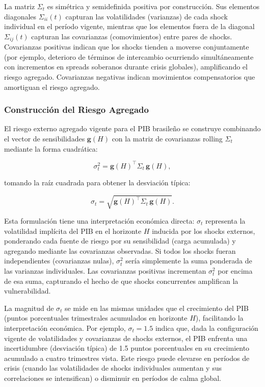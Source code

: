 \documentclass[3p,11pt,draft,natbib=false]{elsarticle}
\newcommand{\vect}[1]{\boldsymbol{#1}}
\begin{document}
La matriz $\Sigma_t$ es simétrica y semidefinida positiva por construcción. Sus elementos diagonales $\Sigma_{ii}(t)$ capturan las volatilidades (varianzas) de cada shock individual en el período vigente, mientras que los elementos fuera de la diagonal $\Sigma_{ij}(t)$ capturan las covarianzas (comovimientos) entre pares de shocks. Covarianzas positivas indican que los shocks tienden a moverse conjuntamente (por ejemplo, deterioro de términos de intercambio ocurriendo simultáneamente con incrementos en spreads soberanos durante crisis globales), amplificando el riesgo agregado. Covarianzas negativas indican movimientos compensatorios que amortiguan el riesgo agregado.

\subsubsection{Construcción del Riesgo Agregado}

El riesgo externo agregado vigente para el PIB brasileño se construye combinando el vector de sensibilidades $\vect{g}(H)$ con la matriz de covarianzas rolling $\Sigma_t$ mediante la forma cuadrática:

\begin{equation}
\sigma_t^2 = \vect{g}(H)^\top \Sigma_t\, \vect{g}(H),
\label{eq:aggregate_risk}
\end{equation}

tomando la raíz cuadrada para obtener la desviación típica:

\begin{equation}
\sigma_t = \sqrt{\vect{g}(H)^\top \Sigma_t\, \vect{g}(H)}.
\label{eq:risk_stdev}
\end{equation}

Esta formulación tiene una interpretación económica directa: $\sigma_t$ representa la volatilidad implícita del PIB en el horizonte $H$ inducida por los shocks externos, ponderando cada fuente de riesgo por su sensibilidad (carga acumulada) y agregando mediante las covarianzas observadas. Si todos los shocks fueran independientes (covarianzas nulas), $\sigma_t^2$ sería simplemente la suma ponderada de las varianzas individuales. Las covarianzas positivas incrementan $\sigma_t^2$ por encima de esa suma, capturando el hecho de que shocks concurrentes amplifican la vulnerabilidad.

La magnitud de $\sigma_t$ se mide en las mismas unidades que el crecimiento del PIB (puntos porcentuales trimestrales acumulados en horizonte $H$), facilitando la interpretación económica. Por ejemplo, $\sigma_t = 1.5$ indica que, dada la configuración vigente de volatilidades y covarianzas de shocks externos, el PIB enfrenta una incertidumbre (desviación típica) de 1.5 puntos porcentuales en su crecimiento acumulado a cuatro trimestres vista. Este riesgo puede elevarse en períodos de crisis (cuando las volatilidades de shocks individuales aumentan y sus correlaciones se intensifican) o disminuir en períodos de calma global.
\end{document}
